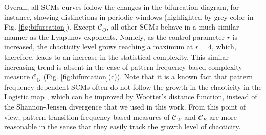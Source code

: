 \documentclass[12pt,aip,cha,reprint,nofootinbib]{revtex4-1}
\begin{document}
Overall, all SCMs curves follow the changes in the bifurcation diagram, for instance, showing distinctions in periodic windows  (highlighted by grey color in Fig. \ref{fig:bifurcation}). Except $\mathcal{C}_O$, all other SCMs behave in a much similar manner as the Lyapunov exponents. Namely, as the control parameter $r$ is increased, the chaoticity level grows reaching a maximum at $r = 4$, which, therefore, leads to an increase in the statistical complexity. This similar increasing trend is absent in the case of pattern frequency based complexity measure $\mathcal{C}_O$ (Fig. \ref{fig:bifurcation}(c)). Note that it is a known fact that pattern frequency dependent SCMs often do not follow the growth in the chaoticity in the Logistic map \cite{MartinPLA2003}, which can be improved by Wootter's distance function, instead of the Shannon-Jensen divergence that we used in this work. From this point of view, pattern transition frequency based measures of $\mathcal{C}_W$ and $\mathcal{C}_E$ are more reasonable in the sense that they easily track the growth level of chaoticity. 
\end{document}
